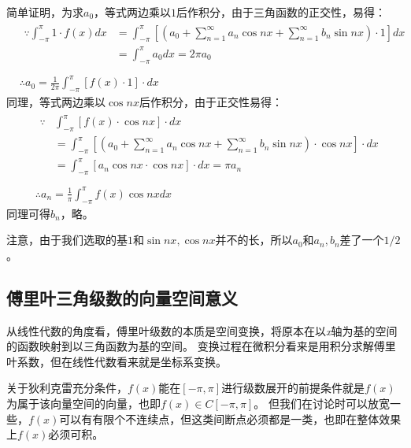 简单证明，为求$a_0$，等式两边乘以$1$后作积分，由于三角函数的正交性，易得：
\begin{align*}
&\begin{aligned}
	\because \int_{-\pi}^{\pi}{1\cdot f\left( x \right) dx}&=\int_{-\pi}^{\pi}{\left[ \left( a_0+\sum_{n=1}^{\infty}{a_n\cos nx}+\sum_{n=1}^{\infty}{b_n\sin nx} \right) \cdot 1 \right] dx}\\
	&=\int_{-\pi}^{\pi}{a_0dx}=2\pi a_0\\
\end{aligned} \\
&\therefore a_0=\frac{1}{2\pi}\int_{-\pi}^{\pi}{\left[ f\left( x \right) \cdot 1 \right] \cdot dx}
\end{align*}
同理，等式两边乘以$\cos nx$后作积分，由于正交性易得：
\begin{align*}
&\begin{aligned}
	\because &\int_{-\pi}^{\pi}{\left[ f\left( x \right) \cdot \cos nx \right] \cdot dx} \\
    &=\int_{-\pi}^{\pi}{\left[ \left( a_0+\sum_{n=1}^{\infty}{a_n\cos nx}+\sum_{n=1}^{\infty}{b_n\sin nx} \right) \cdot \cos nx \right] \cdot dx}\\
	&=\int_{-\pi}^{\pi}{\left[ a_n\cos nx\cdot \cos nx \right] \cdot dx}=\pi a_n\\
\end{aligned} \\
&\therefore a_n=\frac{1}{\pi}\int_{-\pi}^{\pi}{f\left( x \right) \cos nxdx}
\end{align*}
同理可得$b_n$，略。

注意，由于我们选取的基$1$和$\sin nx,\cos nx$并不的长，所以$a_0$和$a_n,b_n$差了一个$1/2$。

\subsection{傅里叶三角级数的向量空间意义}

从线性代数的角度看，傅里叶级数的本质是空间变换，将原本在以{\it x}轴为基的空间的函数映射到以三角函数为基的空间。
变换过程在微积分看来是用积分求解傅里叶系数，但在线性代数看来就是坐标系变换。

关于狄利克雷充分条件，$f\left( x \right) $能在$\left[ -\pi ,\pi \right] $进行级数展开的前提条件就是$f\left( x \right) $为属于该向量空间的向量，也即$f\left( x \right) \in C\left[ -\pi ,\pi \right] $。
但我们在讨论时可以放宽一些，$f\left( x \right) $可以有有限个不连续点，但这类间断点必须都是一类，也即在整体效果上$f\left( x \right) $必须可积。

